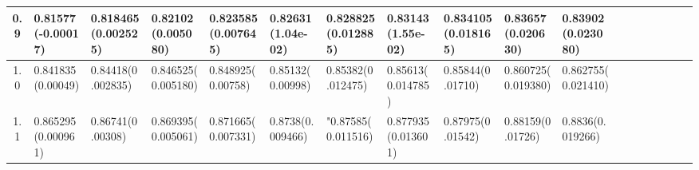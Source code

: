 \documentclass[
	article,			%
	12pt,				%
	twoside,			%
	a4paper,			%
	english,			%
	brazil,				%
	]{abntex2}
\begin{document}
\begin{landscape}
\begin{table}
\begin{tabular}{c||p{18mm}|p{18mm}|p{18mm}|p{18mm}|p{18mm}|p{18mm}|p{18mm}|p{18mm}|p{18mm}|p{18mm}|p{18mm}|p{18mm}|p{18mm}|p{18mm}|p{18mm}|p{18mm}|p{18mm}}
    			0.9 & 0.81577\newline(-0.00017)&0.818465\newline(0.002525)&0.82102\newline(0.005080)&0.823585\newline(0.007645)&0.82631\newline(1.04e-02)&0.828825\newline(0.012885)&0.83143\newline(1.55e-02)&0.834105\newline(0.018165)&0.83657\newline(0.020630)&0.83902\newline(0.023080)\\
    			\hline\hline
    			1.0 &0.841835\newline(0.00049)&0.84418\newline(0.002835)&0.846525\newline(0.005180)&0.848925\newline(0.00758)&0.85132\newline(0.00998)&0.85382\newline(0.012475)&0.85613\newline(0.014785)&0.85844\newline(0.01710)&0.860725\newline(0.019380)&0.862755\newline(0.021410)\\
    			\hline
    			1.1 & 0.865295\newline(0.000961)& 0.86741\newline(0.00308)&0.869395\newline(0.005061)&0.871665\newline(0.007331)&0.8738\newline(0.009466)&"0.87585\newline(0.011516)&0.877935\newline(0.013601)&0.87975\newline(0.01542)&0.88159\newline(0.01726)&0.8836\newline(0.019266)\\
    			\hline
    			

\end{tabular}
\end{table}
\end{landscape}
\end{document}
